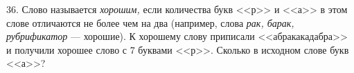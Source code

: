 36. Слово называется {\it хорошим,} если количества букв <<р>> и <<а>> в этом слове отличаются не более чем на два (например, слова {\it рак, барак, рубрификатор} --- хорошие). К хорошему слову приписали <<абракакадабра>> и получили хорошее слово с 7 буквами <<р>>. Сколько в исходном слове букв <<а>>?\\
